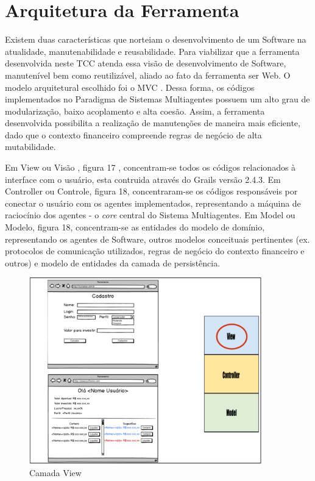 \section{Arquitetura da Ferramenta}

Existem duas características que norteiam o desenvolvimento de um Software na atualidade, manutenabilidade e reusabilidade. Para viabilizar que a ferramenta desenvolvida neste TCC atenda essa visão de desenvolvimento de Software, manutenível bem como reutilizável, aliado ao fato da ferramenta ser Web. O modelo arquitetural escolhido foi o MVC \cite{krasner1988}. Dessa forma, os códigos implementados no Paradigma de Sistemas Multiagentes possuem um alto grau de modularização, baixo acoplamento e alta coesão. Assim, a ferramenta desenvolvida possibilita a realização de  manutenções de maneira mais eficiente, dado que o contexto financeiro compreende regras de negócio de alta mutabilidade. 

Em View ou Visão , figura 17 , concentram-se todos os códigos relacionados à interface com o usuário, esta contruida através do Grails versão 2.4.3. Em Controller ou Controle, figura 18, concentraram-se os códigos responsáveis por conectar o usuário com os agentes implementados, representando a máquina de raciocínio dos agentes - o \textit{core} central do Sistema Multiagentes. Em Model ou Modelo, figura 18, concentram-se as entidades do modelo de domínio, representando os agentes de Software, outros modelos conceituais pertinentes (ex. protocolos de comunicação utilizados, regras de negócio do contexto financeiro e outros) e modelo de entidades da camada de persistência.

\begin{figure}[H]
\centering
\label{f17}
\includegraphics[width=0.9\textwidth]{figuras/f24}
\caption{Camada View}
\end{figure}
\FloatBarrier

